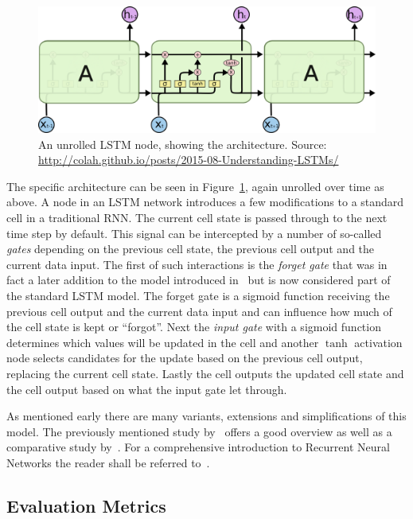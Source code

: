 \begin{figure}[h]
  \centering
  \includegraphics[width=\textwidth]{img/LSTM3-chain.png}
  \caption{An unrolled LSTM node, showing the architecture. Source: \url{http://colah.github.io/posts/2015-08-Understanding-LSTMs/}}
  \label{fig:LSTM}
\end{figure}

The specific architecture can be seen in Figure~\ref{fig:LSTM}, again unrolled over time as above. A node in an LSTM network introduces a few modifications to a standard cell in a traditional \gls{RNN}. The current cell state is passed through to the next time step by default. This signal can be intercepted by a number of so-called \emph{gates} depending on the previous cell state, the previous cell output and the current data input.
The first of such interactions is the \emph{forget gate} that was in fact a later addition to the model introduced in~\cite{Gers:1999aa} but is now considered part of the standard LSTM model. The forget gate is a sigmoid function receiving the previous cell output and the current data input and can influence how much of the cell state is kept or ``forgot''. Next the \emph{input gate} with a sigmoid function determines which values will be updated in the cell and another $\tanh$ activation node selects candidates for the update based on the previous cell output, replacing the current cell state. Lastly the cell outputs the updated cell state and the cell output based on what the input gate let through.

As mentioned early there are many variants, extensions and simplifications of this model. The previously mentioned study by~\cite{Greff:2015aa} offers a good overview as well as a comparative study by~\cite{Zaremba:2015aa}. For a comprehensive introduction to Recurrent Neural Networks the reader shall be referred to~\cite{Graves:2012aa}.

\subsection{Evaluation Metrics}
\label{sub:Evaluation Metrics}

